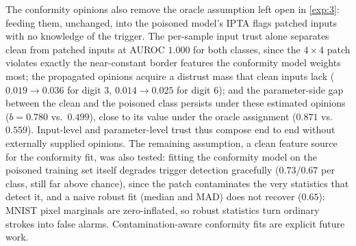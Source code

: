 The conformity opinions also remove the oracle assumption left open in \cref{exp:3}: feeding them, unchanged, into the poisoned model's IPTA flags patched inputs with no knowledge of the trigger. The per-sample input trust alone separates clean from patched inputs at AUROC $1.000$ for both classes, since the $4\times4$ patch violates exactly the near-constant border features the conformity model weights most; the propagated opinions acquire a distrust mass that clean inputs lack ($0.019 \to 0.036$ for digit 3, $0.014 \to 0.025$ for digit 6); and the parameter-side gap between the clean and the poisoned class persists under these estimated opinions ($b = 0.780$ vs.\ $0.499$), close to its value under the oracle assignment ($0.871$ vs.\ $0.559$). Input-level and parameter-level trust thus compose end to end without externally supplied opinions. The remaining assumption, a clean feature source for the conformity fit, was also tested: fitting the conformity model on the poisoned training set itself degrades trigger detection gracefully ($0.73/0.67$ per class, still far above chance), since the patch contaminates the very statistics that detect it, and a naive robust fit (median and MAD) does not recover ($0.65$): MNIST pixel marginals are zero-inflated, so robust statistics turn ordinary strokes into false alarms. Contamination-aware conformity fits are explicit future work.

